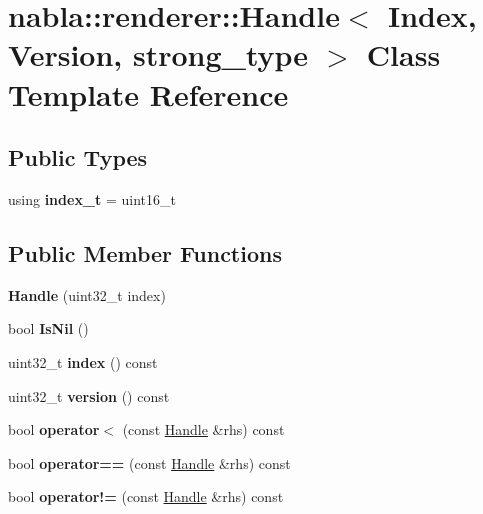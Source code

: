 \hypertarget{classnabla_1_1renderer_1_1_handle}{}\section{nabla\+::renderer\+::Handle$<$ Index, Version, strong\+\_\+type $>$ Class Template Reference}
\label{classnabla_1_1renderer_1_1_handle}
\subsection*{Public Types}
\begin{DoxyCompactItemize}
\item 
\mbox{\label{classnabla_1_1renderer_1_1_handle_a62821a7009ea6cfef8184dc8c0a13805}} 
using {\bfseries index\+\_\+t} = uint16\+\_\+t
\end{DoxyCompactItemize}
\subsection*{Public Member Functions}
\begin{DoxyCompactItemize}
\item 
\mbox{\label{classnabla_1_1renderer_1_1_handle_a780d188837a4c9294b42aa550dad7a6b}} 
{\bfseries Handle} (uint32\+\_\+t index)
\item 
\mbox{\label{classnabla_1_1renderer_1_1_handle_a337d6f876b37af6e5ea4fe7bd86f89b0}} 
bool {\bfseries Is\+Nil} ()
\item 
\mbox{\label{classnabla_1_1renderer_1_1_handle_aea475105a6feccc15eff23d9dc46c731}} 
uint32\+\_\+t {\bfseries index} () const
\item 
\mbox{\label{classnabla_1_1renderer_1_1_handle_a922858788e3aec8483e7434fdc0a0a4a}} 
uint32\+\_\+t {\bfseries version} () const
\item 
\mbox{\label{classnabla_1_1renderer_1_1_handle_aba7040fafbfa3ee15149439c24c8e3c9}} 
bool {\bfseries operator$<$} (const \mbox{\hyperlink{classnabla_1_1renderer_1_1_handle}{Handle}} \&rhs) const
\item 
\mbox{\label{classnabla_1_1renderer_1_1_handle_a3f2594245fc75f281e72cd8e57f24709}} 
bool {\bfseries operator==} (const \mbox{\hyperlink{classnabla_1_1renderer_1_1_handle}{Handle}} \&rhs) const
\item 
\mbox{\label{classnabla_1_1renderer_1_1_handle_ae9f1046ae30e6a8d77aa0d3e0810f00c}} 
bool {\bfseries operator!=} (const \mbox{\hyperlink{classnabla_1_1renderer_1_1_handle}{Handle}} \&rhs) const
\end{DoxyCompactItemize}
